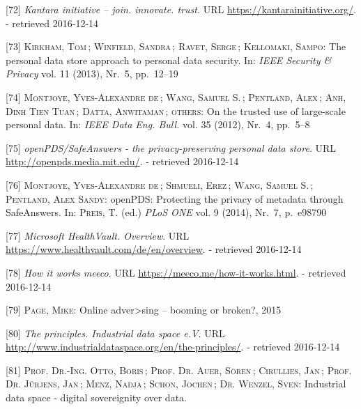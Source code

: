 \documentclass[12pt,english,a4paper,titlepage,cleardoublepage=empty,dottedtoc]{report}
\begin{document}
\hypertarget{ref-web_kantara-initiative}{}
{[}72{]} \emph{Kantara initiative -- join. innovate. trust.} URL
\url{https://kantarainitiative.org/}. - retrieved 2016-12-14

\hypertarget{ref-paper_2014_personal-data-store-approach}{}
{[}73{]} \textsc{Kirkham, Tom}\,; \textsc{Winfield, Sandra}\,;
\textsc{Ravet, Serge}\,; \textsc{Kellomaki, Sampo}: The personal data
store approach to personal data security. In: \emph{IEEE Security \&
Privacy} vol. 11 (2013), Nr.~5, pp.~12--19

\hypertarget{ref-paper_2012_openpds_on-trusted-use-of-large-scale-personal-data}{}
{[}74{]} \textsc{Montjoye, Yves-Alexandre de}\,; \textsc{Wang, Samuel
S.}\,; \textsc{Pentland, Alex}\,; \textsc{Anh, Dinh Tien Tuan}\,;
\textsc{Datta, Anwitaman}\,; \textsc{others}: On the trusted use of
large-scale personal data. In: \emph{IEEE Data Eng. Bull.} vol. 35
(2012), Nr.~4, pp.~5--8

\hypertarget{ref-web_mit_openpds-safeanswers-project-page}{}
{[}75{]} \emph{openPDS/SafeAnswers - the privacy-preserving personal
data store}. URL \url{http://openpds.media.mit.edu/}. - retrieved
2016-12-14

\hypertarget{ref-paper_2014_openpds_protecting-privacy-of-meta-data-through-safeanswers}{}
{[}76{]} \textsc{Montjoye, Yves-Alexandre de}\,; \textsc{Shmueli,
Erez}\,; \textsc{Wang, Samuel S.}\,; \textsc{Pentland, Alex Sandy}:
openPDS: Protecting the privacy of metadata through SafeAnswers. In:
\textsc{Preis, T.} (ed.) \emph{PLoS ONE} vol. 9 (2014), Nr.~7, p.~e98790

\hypertarget{ref-web_microsoft_healthvault}{}
{[}77{]} \emph{Microsoft HealthVault. Overview}. URL
\url{https://www.healthvault.com/de/en/overview}. - retrieved 2016-12-14

\hypertarget{ref-web_meeco_how-it-works}{}
{[}78{]} \emph{How it works meeco}. URL
\url{https://meeco.me/how-it-works.html}. - retrieved 2016-12-14

\hypertarget{ref-slides_2015_meeco-case-study}{}
{[}79{]} \textsc{Page, Mike}: Online adver\textgreater{}sing -- booming
or broken?, 2015

\hypertarget{ref-web_industrial-data-space}{}
{[}80{]} \emph{The principles. Industrial data space e.V.} URL
\url{http://www.industrialdataspace.org/en/the-principles/}. - retrieved
2016-12-14

\hypertarget{ref-whitepaper_2016_industrial-data-space}{}
{[}81{]} \textsc{Prof. Dr.-Ing. Otto, Boris}\,; \textsc{Prof. Dr. Auer,
Sören}\,; \textsc{Cirullies, Jan}\,; \textsc{Prof. Dr. Jürjens, Jan}\,;
\textsc{Menz, Nadja}\,; \textsc{Schon, Jochen}\,; \textsc{Dr. Wenzel,
Sven}: Industrial data space - digital sovereignity over data.
\end{document}
